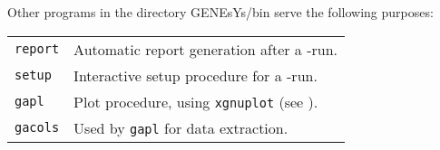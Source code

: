 Other programs in the directory GENEsYs/bin serve the following purposes:
%
\begin{center}
\begin{tabular}{ll}
	\verb/report/	& Automatic report generation after a \GA-run. 	\\
	\verb/setup/	& Interactive setup procedure for a \GA-run.	\\
	\verb/gapl/	& Plot procedure, using \verb/xgnuplot/
			  (see \File{README}).				\\
	\verb/gacols/	& Used by \verb/gapl/ for data extraction.	\\
\end{tabular}
\end{center}

